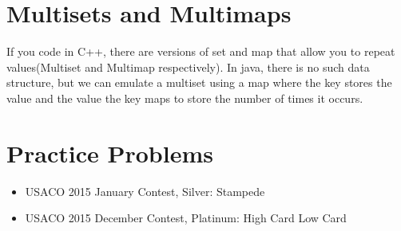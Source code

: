 \documentclass{article}
\begin{document}
\section{Multisets and Multimaps}
    If you code in C++, there are versions of set and map that allow you to repeat values(Multiset and Multimap respectively). In java, there is no such data structure, but we can emulate a multiset using a map where the key stores the value and the value the key maps to store the number of times it occurs.

\section{Practice Problems}
    \begin{itemize}
        \item USACO 2015 January Contest, Silver: Stampede
        \item USACO 2015 December Contest, Platinum: High Card Low Card
    \end{itemize}
\end{document}
